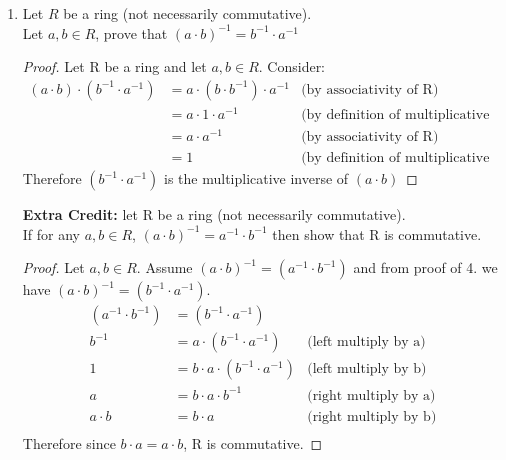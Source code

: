 \documentclass{article}
\begin{document}
\begin{enumerate}
\begin{proof}
				Therefore M is a Subring of R
		\end{proof}
		
		\item Let $R$ be a ring (not necessarily commutative). \\
		Let $a,b \in R$, prove that $(a \cdot b)^{-1} = b^{-1} \cdot a^{-1}$
		\begin{proof}
			Let R be a ring and let $a,b \in R$. 
			Consider:
			\begin{align*}
				 (a \cdot b) \cdot (b^{-1} \cdot a^{-1}) &= a \cdot (b \cdot b^{-1}) \cdot a^{-1} & \text{(by associativity of R)}\\
						 						&= a \cdot 1 \cdot a^{-1} & \text{(by definition of multiplicative inverse)}\\
						 						&= a \cdot  a^{-1} & \text{(by associativity of R)}\\
						 						&= 1 &\text{(by definition of multiplicative inverse)}
			\end{align*}
			Therefore  $(b^{-1} \cdot a^{-1})$ is the multiplicative inverse of $(a\cdot b)$
		\end{proof}
		
		\textbf{Extra Credit:}
		let R be a ring (not necessarily commutative).\\
		If for any $a,b \in R$, $(a\cdot b)^{-1} = a^{-1} \cdot b^{-1}$ then show that R is commutative.
		\begin{proof}
		Let $a,b \in R$.
		Assume $(a \cdot b)^{-1} =(a^{-1} \cdot b^{-1})$ and from proof of 4. we have $(a \cdot b)^{-1} = (b^{-1} \cdot a^{-1})$. 
		\begin{align*}
			(a^{-1} \cdot b^{-1}) &= (b^{-1} \cdot a^{-1})\\
			 b^{-1} &= a \cdot (b^{-1} \cdot a^{-1})		 &\text{(left multiply by a)}\\
			 	  1 &= b\cdot a \cdot (b^{-1} \cdot a^{-1})  &\text{(left multiply by b)}\\
			 	  a &= b \cdot a \cdot b^{-1} 				 &\text{(right multiply by a)}\\
			 a \cdot b &= b \cdot a                          &\text{(right multiply by b)}\\
		\end{align*}
		Therefore since $b \cdot a = a \cdot b$, R is commutative. 
		\end{proof}
	\end{enumerate}
\end{document}
